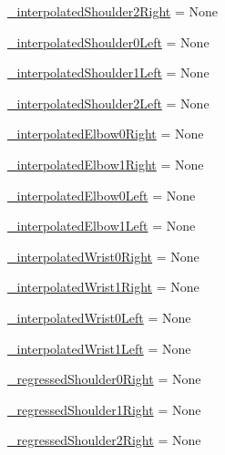 \begin{DoxyCompactItemize}
\item 
\mbox{\hyperlink{namespacesteering__response__test_a03d8e82b92d9dcb1f4bfa0c761c38fe3}{\+\_\+interpolated\+Shoulder2\+Right}} = None
\item 
\mbox{\hyperlink{namespacesteering__response__test_a3d5795325df33f05dc061ee8f517988f}{\+\_\+interpolated\+Shoulder0\+Left}} = None
\item 
\mbox{\hyperlink{namespacesteering__response__test_a6555823dba372d2a8bf4bb2b5dd78a6f}{\+\_\+interpolated\+Shoulder1\+Left}} = None
\item 
\mbox{\hyperlink{namespacesteering__response__test_a0648bde1b1556a0df40d8632813d9a64}{\+\_\+interpolated\+Shoulder2\+Left}} = None
\item 
\mbox{\hyperlink{namespacesteering__response__test_a2c8cb2460ef699673d5b476f8c8963ef}{\+\_\+interpolated\+Elbow0\+Right}} = None
\item 
\mbox{\hyperlink{namespacesteering__response__test_a0fcaf50378e33645e4a155f3d3acbbfb}{\+\_\+interpolated\+Elbow1\+Right}} = None
\item 
\mbox{\hyperlink{namespacesteering__response__test_aa99d269120559745156b131a845a5007}{\+\_\+interpolated\+Elbow0\+Left}} = None
\item 
\mbox{\hyperlink{namespacesteering__response__test_adb4b1bfc12b1a002861cf823f341d347}{\+\_\+interpolated\+Elbow1\+Left}} = None
\item 
\mbox{\hyperlink{namespacesteering__response__test_af366ccc2b467eed42d1fc8e402744800}{\+\_\+interpolated\+Wrist0\+Right}} = None
\item 
\mbox{\hyperlink{namespacesteering__response__test_a9dc2ae3ed2b3d4522f20c72de34b305a}{\+\_\+interpolated\+Wrist1\+Right}} = None
\item 
\mbox{\hyperlink{namespacesteering__response__test_a04e82bf6051720af12fca4a1ead455de}{\+\_\+interpolated\+Wrist0\+Left}} = None
\item 
\mbox{\hyperlink{namespacesteering__response__test_a02b7df9696853319cc72049ae8e4ae2d}{\+\_\+interpolated\+Wrist1\+Left}} = None
\item 
\mbox{\hyperlink{namespacesteering__response__test_a1ee511ef9c33598e8a3cc9e13ba6804e}{\+\_\+regressed\+Shoulder0\+Right}} = None
\item 
\mbox{\hyperlink{namespacesteering__response__test_ab09aba402370cc87182acc167eb0fc95}{\+\_\+regressed\+Shoulder1\+Right}} = None
\item 
\mbox{\hyperlink{namespacesteering__response__test_a319e4ed6072e7f032869a9ee6485f8e2}{\+\_\+regressed\+Shoulder2\+Right}} = None

\end{DoxyCompactItemize}
